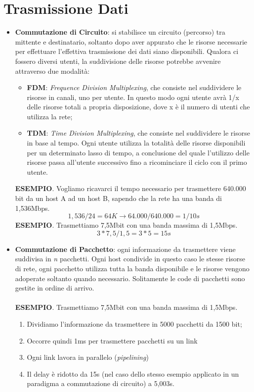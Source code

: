 \section{Trasmissione Dati}
\begin{itemize}
    \item \textbf{Commutazione di Circuito}: si stabilisce un circuito (percorso) tra mittente e destinatario, soltanto dopo aver appurato che le risorse necessarie per effettuare l'effettiva trasmissione dei dati siano disponibili.
    Qualora ci fossero diversi utenti, la suddivisione delle risorse potrebbe avvenire attraverso due modalità:
    \begin{itemize}
        \item \textbf{FDM}: \textit{Frequence Division Multiplexing}, che consiste nel suddividere le risorse in canali, uno per utente. In questo modo ogni utente avrà 1/x delle risorse totali a propria disposizione, dove x è il numero di utenti che utilizza la rete;
        \item \textbf{TDM}: \textit{Time Division Multiplexing}, che consiste nel suddividere le risorse in base al tempo. Ogni utente utilizza la totalità delle risorse disponibili per un determinato lasso di tempo, a conclusione del quale l'utilizzo delle risorse passa all'utente successivo fino a ricominciare il ciclo con il primo utente.
    \end{itemize}
    \textbf{ESEMPIO}. Vogliamo ricavarci il tempo necessario per trasmettere 640.000 bit da un host A ad un host B, sapendo che la rete ha una banda di 1,536Mbps.
    \begin{equation}
        1,536/24 = 64K \to 64.000/640.000 = 1/10s
    \end{equation}
    \textbf{ESEMPIO}. Trasmettiamo 7,5Mbit con una banda massima di 1,5Mbps.
    \begin{equation}
        3*7,5/1,5 = 3*5 = 15s
    \end{equation}
    \newpage
    
    \item \textbf{Commutazione di Pacchetto}: ogni informazione da trasmettere viene suddivisa in \textit{n} pacchetti. Ogni host condivide in questo caso le stesse risorse di rete, ogni pacchetto utilizza tutta la banda disponibile e le risorse vengono adoperate soltanto quando necessario.
    Solitamente le code di pacchetti sono gestite in ordine di arrivo. \\ \\
    \textbf{ESEMPIO}. Trasmettiamo 7,5Mbit con una banda massima di 1,5Mbps.
    \begin{enumerate}
        \item Dividiamo l'informazione da trasmettere in 5000 pacchetti da 1500 bit;
        \item Occorre quindi 1ms per trasmettere pacchetti su un link
        \item Ogni link lavora in parallelo (\textit{pipelining})
        \item Il delay è ridotto da 15s (nel caso dello stesso esempio applicato in un paradigma a commutazione di circuito) a 5,003s.
    \end{enumerate}
\end{itemize}
